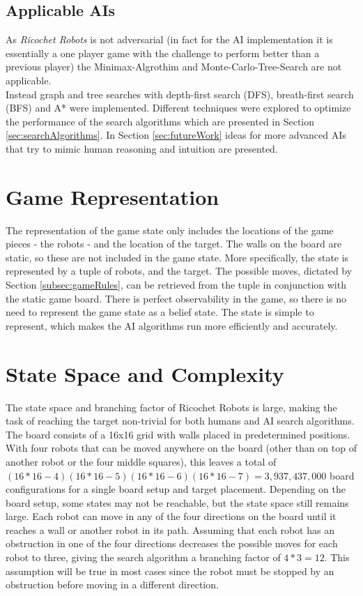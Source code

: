 \documentclass[a4paper,10pt]{article}
\begin{document}
  \subsection{Applicable AIs}
  As \textit{Ricochet Robots} is not adversarial (in fact for the AI implementation it is essentially a one player game with the challenge to perform better than a previous player) the Minimax-Algrothim and Monte-Carlo-Tree-Search are not applicable. \\
  Instead graph and tree searches with depth-first search (DFS), breath-first search (BFS) and A* were implemented. Different techniques were explored to optimize the performance of the search algorithms which are presented in Section \ref{sec:searchAlgorithms}. In Section \ref{sec:futureWork} ideas for more advanced AIs that try to mimic human reasoning and intuition are presented.

\section{Game Representation}
\label{sec:gameRep}
The representation of the game state only includes the locations of the game pieces - the robots - and the location of the target. The walls on the board are static,
so these are not included in the game state. More specifically, the state is represented by a tuple of robots, and the target. The possible moves, dictated by Section
\ref{subsec:gameRules}, can be retrieved from the tuple in conjunction with the static game board. There is perfect observability in the game, so there is no need to represent
the game state as a belief state. The state is simple to represent, which makes the AI algorithms run more efficiently and accurately.

\section{State Space and Complexity}
\label{sec:stateSpace}
The state space and branching factor of Ricochet Robots is large, making the task of reaching the target non-trivial for both humans and AI search algorithms.
The board consists of a 16x16 grid with walls placed in predetermined positions.  With four robots that can be moved anywhere on the board (other
than on top of another robot or the four middle squares), this leaves a total of $(16*16-4)(16*16-5)(16*16-6)(16*16-7) = 3,937,437,000$ board configurations for a single board setup and
target placement.  Depending on the board setup, some states may not be reachable, but the state space still remains large. Each robot can move in any of the
four directions on the board until it reaches a wall or another robot in its path.  Assuming that each robot has an obstruction in one of the four directions
decreases the possible moves for each robot to three, giving the search algorithm a branching factor of $4*3 = 12$.  This assumption will be true in most cases since
the robot must be stopped by an obstruction before moving in a different direction. \\
\end{document}
